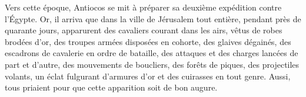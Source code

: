 Vers cette époque, Antiocos se mit à préparer sa deuxième expédition contre l’Égypte.
Or, il arriva que dans la ville de Jérusalem tout entière, pendant près de quarante jours,
	apparurent des cavaliers courant dans les airs, vêtus de robes brodées d’or,
	des troupes armées disposées en cohorte, des glaives dégainés,
	des escadrons de cavalerie en ordre de bataille,
	des attaques et des charges lancées de part et d’autre,
	des mouvements de boucliers, des forêts de piques, des projectiles volants,
	un éclat fulgurant d’armures d’or et des cuirasses en tout genre.
Aussi, tous priaient pour que cette apparition soit de bon augure.
